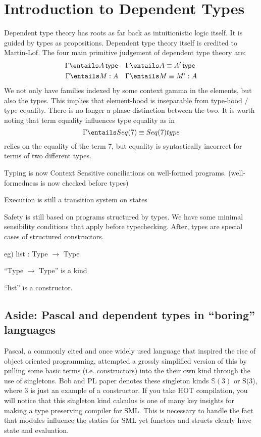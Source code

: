 \documentclass[11pt]{article}
\begin{document}
\section*{Introduction to Dependent Types}

Dependent type theory has roots as far back as intuitionistic logic itself. It is guided by types as propositions. Dependent type theory itself is credited to Martin-Lof. The four main primitive judgement of dependent type theory are:
\begin{align*}
    \Gamma \entails \isTp{A} \quad & \Gamma \entails \eqTp{A}{A'} \\
    \Gamma \entails M : A \quad & \Gamma \entails M \equiv M' : A \\
\end{align*}
We not only have families indexed by some context gamma in the elements, but also the types. This implies that element-hood is inseparable from type-hood / type equality. There is no longer a phase distinction between the two. It is worth noting that term equality influences type equality as in
$$\Gamma \entails Seq(7) \equiv Seq(7) type$$
relies on the equality of the term 7, but equality is syntactically incorrect for terms of two different types.

Typing is now Context Sensitive conciliations on well-formed programs. (well-formedness is now checked before types)

Execution is still a transition system on states

Safety is still based on programs structured by types. We have some minimal sensibility conditions that apply before typechecking. After, types are special cases of structured constructors.

eg) list : Type $\rightarrow$ Type

``Type $\rightarrow$ Type'' is a kind 

``list'' is a constructor.

\subsection*{Aside: Pascal and dependent types in ``boring'' languages}

Pascal, a commonly cited and once widely used language that inspired the rise of object oriented programming, attempted a grossly simplified version of this by pulling some basic terms (i.e. constructors) into the their own kind through the use of singletons. Bob and PL paper denotes these singleton kinds $\mathbb{S}(3)$ or S(3), where 3 is just an example of a constructor. If you take HOT compilation, you will notice that this singleton kind calculus is one of many key insights for making a type preserving compiler for SML. This is necessary to handle the fact that modules influence the statics for SML yet functors and structs clearly have state and evaluation.
\end{document}
